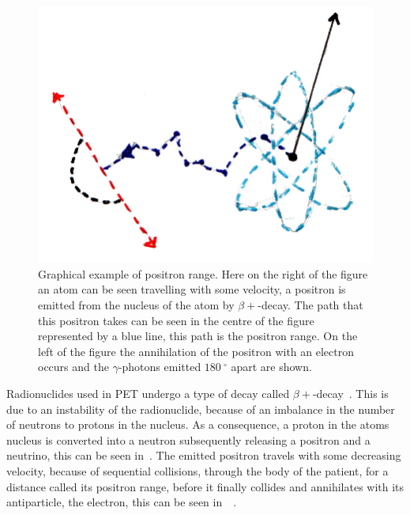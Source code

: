                 \begin{figure}
                    \centering
                    
                    \includegraphics[width=1.0\linewidth]{figures/background_positron_range.png}
                    
                    \captionsetup{singlelinecheck=false, justification=raggedright}
                    \caption{Graphical example of positron range. Here on the right of the figure an atom can be seen travelling with some velocity, a positron is emitted from the nucleus of the atom by $\beta+$-decay. The path that this positron takes can be seen in the centre of the figure represented by a blue line, this path is the positron range. On the left of the figure the annihilation of the positron with an electron occurs and the $\gamma$-photons emitted $\SI{180}{^{\circ}}$ apart are shown.} \label{fig:decay_and_annihilation_positron_range}
                \end{figure}
                
                Radionuclides used in \gls{PET} undergo a type of decay called $\beta+$-decay~. This is due to an instability of the radionuclide, because of an imbalance in the number of neutrons to protons in the nucleus. As a consequence, a proton in the atoms nucleus is converted into a neutron subsequently releasing a positron and a neutrino, this can be seen in~. The emitted positron travels with some decreasing velocity, because of sequential collisions, through the body of the patient, for a distance called its positron range, before it finally collides and annihilates with its antiparticle, the electron, this can be seen in~~. %
                
